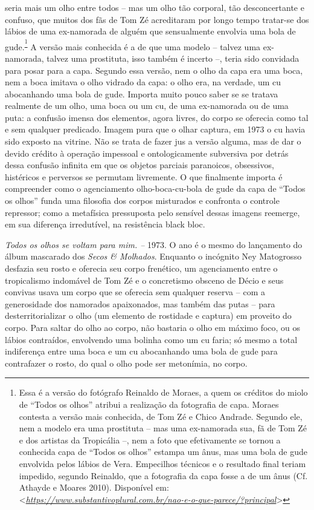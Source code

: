 seria mais um olho entre todos -- mas um olho tão corporal, tão
desconcertante e confuso, que muitos dos fãs de Tom Zé acreditaram por
longo tempo tratar-se dos lábios de uma ex-namorada de alguém que
sensualmente envolvia uma bola de gude.\textsuperscript{\footnote{Essa é
  a versão do fotógrafo Reinaldo de Moraes, a quem os créditos do miolo
  de ``Todos os olhos'' atribui a realização da fotografia de capa.
  Moraes contesta a versão mais conhecida, de Tom Zé e Chico Andrade.
  Segundo ele, nem a modelo era uma prostituta -- mas uma ex-namorada
  sua, fã de Tom Zé e dos artistas da Tropicália --, nem a foto que
  efetivamente se tornou a conhecida capa de ``Todos os olhos'' estampa
  um ânus, mas uma bola de gude envolvida pelos lábios de Vera.
  Empecilhos técnicos e o resultado final teriam impedido, segundo
  Reinaldo, que a fotografia da capa fosse a de um ânus (Cf. Athayde e
  Moares 2010). Disponível em:
  \textless{}\href{https://www.substantivoplural.com.br/nao-e-o-que-parece/?principal}{\emph{https://www.substantivoplural.com.br/nao-e-o-que-parece/?principal}}\textgreater{}}}
A versão mais conhecida é a de que uma modelo -- talvez uma ex-namorada,
talvez uma prostituta, isso também é incerto --, teria sido convidada
para posar para a capa. Segundo essa versão, nem o olho da capa era uma
boca, nem a boca imitava o olho vidrado da capa: o olho era, na verdade,
um cu abocanhando uma bola de gude. Importa muito pouco saber se se
tratava realmente de um olho, uma boca ou um cu, de uma ex-namorada ou
de uma puta: a confusão imensa dos elementos, agora livres, do corpo se
oferecia como tal e sem qualquer predicado. Imagem pura que o olhar
captura, em 1973 o cu havia sido exposto na vitrine. Não se trata de
fazer jus a versão alguma, mas de dar o devido crédito à operação
impessoal e ontologicamente subversiva por detrás dessa confusão
infinita em que os objetos parciais paranoicos, obsessivos, histéricos e
perversos se permutam livremente. O que finalmente importa é compreender
como o agenciamento olho-boca-cu-bola de gude da capa de ``Todos os
olhos'' funda uma filosofia dos corpos misturados e confronta o controle
repressor; como a metafísica pressuposta pelo sensível dessas imagens
reemerge, em sua diferença irredutível, na resistência black bloc.

\emph{Todos os olhos se voltam para mim. -- }1973.\emph{ }O ano é o
mesmo do lançamento do álbum mascarado dos \emph{Secos \& Molhados}.
Enquanto o incógnito Ney Matogrosso desfazia seu rosto e oferecia seu
corpo frenético, um agenciamento entre o tropicalismo indomável de Tom
Zé e o concretismo obsceno de Décio e seus convivas usava um corpo que
se oferecia sem qualquer reserva -- com a generosidade dos namorados
apaixonados, mas também das putas -- para desterritorializar o olho (um
elemento de rostidade e captura) em proveito do corpo. Para saltar do
olho ao corpo, não bastaria o olho em máximo foco, ou os lábios
contraídos, envolvendo uma bolinha como um cu faria; só mesmo a total
indiferença entre uma boca e um cu abocanhando uma bola de gude para
contrafazer o rosto, do qual o olho pode ser metonímia, no corpo.

